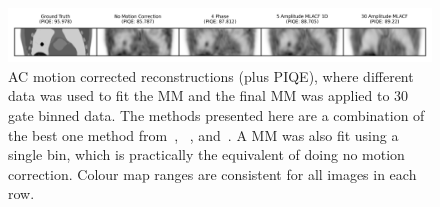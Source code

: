             \begin{figure}
                \centering
                
                \includegraphics[width=1.0\linewidth]{figures/motion_correction_2_results_2_best_visual_analysis.png}
                
                \captionsetup{singlelinecheck=false}
                \caption{
                    \gls{AC} motion corrected reconstructions (plus \gls{PIQE}), where different data was used to fit the \gls{MM} and the final \gls{MM} was applied to $30$ gate binned data. The methods presented here are a combination of the best one method from~, ~, and~. A \gls{MM} was also fit using a single bin, which is practically the equivalent of doing no motion correction. Colour map ranges are consistent for all images in each row.
                }
                
                \label{fig:evaluation_of_pet_ct_motion_correction_incorporating_motion_models_using_mlacf_and_complex_gating_schemes_results_best_visual_analysis}
            \end{figure}
            
